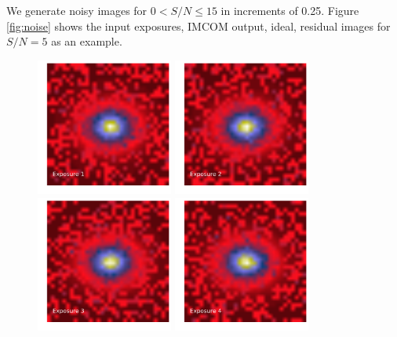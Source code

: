 \documentclass[12pt,preprint]{aastex6}
\begin{document}
We generate noisy images for $0<S/N\leq15$ in increments of 0.25. Figure \ref{fig:noise} shows the input exposures, IMCOM output, ideal, residual images for $S/N=5$ as an example. 
\begin{figure}[!htbp]
\centering
\advance\leftskip-1.0cm
\advance\rightskip-1.0cm
\includegraphics[height=45mm,width=45mm]{f4a.png}
\includegraphics[height=45mm,width=45mm]{f4b.png}
\includegraphics[height=45mm,width=45mm]{f4c.png}
\includegraphics[height=45mm,width=45mm]{f4d.png}

\end{figure}
\end{document}
